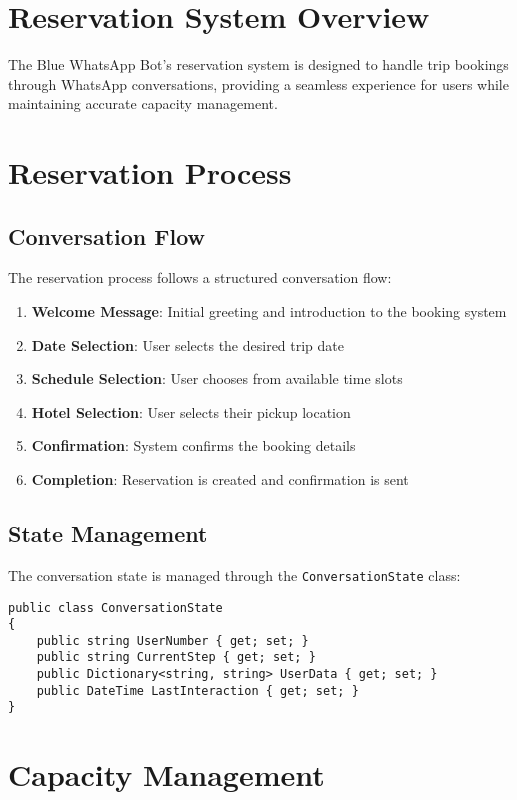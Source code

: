 \section{Reservation System Overview}
The Blue WhatsApp Bot's reservation system is designed to handle trip bookings through WhatsApp conversations, providing a seamless experience for users while maintaining accurate capacity management.

\section{Reservation Process}

\subsection{Conversation Flow}
The reservation process follows a structured conversation flow:

\begin{enumerate}
    \item \textbf{Welcome Message}: Initial greeting and introduction to the booking system
    \item \textbf{Date Selection}: User selects the desired trip date
    \item \textbf{Schedule Selection}: User chooses from available time slots
    \item \textbf{Hotel Selection}: User selects their pickup location
    \item \textbf{Confirmation}: System confirms the booking details
    \item \textbf{Completion}: Reservation is created and confirmation is sent
\end{enumerate}

\subsection{State Management}
The conversation state is managed through the \texttt{ConversationState} class:

\begin{lstlisting}[language=CSharp]
public class ConversationState
{
    public string UserNumber { get; set; }
    public string CurrentStep { get; set; }
    public Dictionary<string, string> UserData { get; set; }
    public DateTime LastInteraction { get; set; }
}
\end{lstlisting}

\section{Capacity Management}

